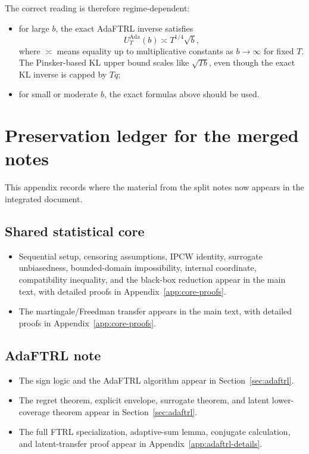 \documentclass[11pt]{article}
\newcommand{\1}{\mathbf{1}}
\begin{document}
The correct reading is therefore regime-dependent:
\begin{itemize}[leftmargin=*,itemsep=2pt]
  \item for large \(b\), the exact AdaFTRL inverse satisfies
  \[
  U_T^{\mathrm{Ada}}(b)\asymp T^{1/4}\sqrt{b},
  \]
  where \(\asymp\) means equality up to multiplicative constants as \(b\to\infty\) for fixed \(T\). The Pinsker-based KL upper bound scales like \(\sqrt{Tb}\), even though the exact KL inverse is capped by \(Tq\);
  \item for small or moderate \(b\), the exact formulas above should be used.
\end{itemize}

\section{Preservation ledger for the merged notes}
\label{app:preservation-ledger}

This appendix records where the material from the split notes now appears in the integrated document.

\subsection*{Shared statistical core}
\begin{itemize}[leftmargin=*,itemsep=2pt]
  \item Sequential setup, censoring assumptions, IPCW identity, surrogate unbiasedness, bounded-domain impossibility, internal coordinate, compatibility inequality, and the black-box reduction appear in the main text, with detailed proofs in Appendix~\ref{app:core-proofs}.
  \item The martingale/Freedman transfer appears in the main text, with detailed proofs in Appendix~\ref{app:core-proofs}.
\end{itemize}

\subsection*{AdaFTRL note}
\begin{itemize}[leftmargin=*,itemsep=2pt]
  \item The sign logic and the AdaFTRL algorithm appear in Section~\ref{sec:adaftrl}.
  \item The regret theorem, explicit envelope, surrogate theorem, and latent lower-coverage theorem appear in Section~\ref{sec:adaftrl}.
  \item The full FTRL specialization, adaptive-sum lemma, conjugate calculation, and latent-transfer proof appear in Appendix~\ref{app:adaftrl-details}.
\end{itemize}
\end{document}
